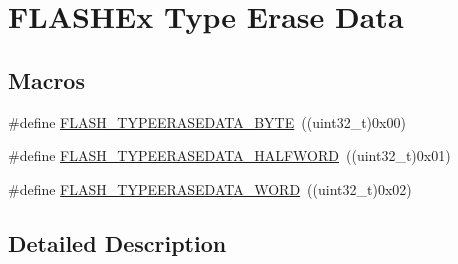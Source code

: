 \hypertarget{group___f_l_a_s_h_ex___type___erase___data}{\section{F\-L\-A\-S\-H\-Ex Type Erase Data}
\label{group___f_l_a_s_h_ex___type___erase___data}
}
\subsection*{Macros}
\begin{DoxyCompactItemize}
\item 
\#define \hyperlink{group___f_l_a_s_h_ex___type___erase___data_ga337f4bfeaea12349f1350b6b25a9c135}{F\-L\-A\-S\-H\-\_\-\-T\-Y\-P\-E\-E\-R\-A\-S\-E\-D\-A\-T\-A\-\_\-\-B\-Y\-T\-E}~((uint32\-\_\-t)0x00)
\item 
\#define \hyperlink{group___f_l_a_s_h_ex___type___erase___data_gafbb0b0f471a5dd56eca9cf1c516d7ed1}{F\-L\-A\-S\-H\-\_\-\-T\-Y\-P\-E\-E\-R\-A\-S\-E\-D\-A\-T\-A\-\_\-\-H\-A\-L\-F\-W\-O\-R\-D}~((uint32\-\_\-t)0x01)
\item 
\#define \hyperlink{group___f_l_a_s_h_ex___type___erase___data_ga56f9f6067a72566ad838b6d0f31df0ad}{F\-L\-A\-S\-H\-\_\-\-T\-Y\-P\-E\-E\-R\-A\-S\-E\-D\-A\-T\-A\-\_\-\-W\-O\-R\-D}~((uint32\-\_\-t)0x02)
\end{DoxyCompactItemize}


\subsection{Detailed Description}


